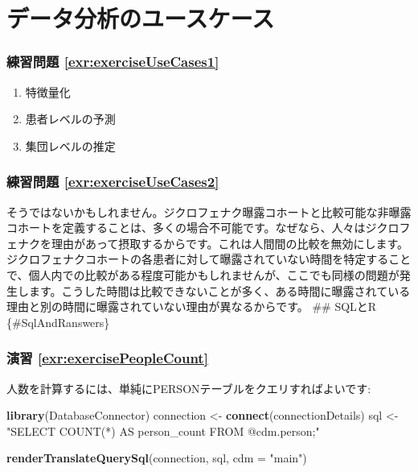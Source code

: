 \documentclass[
  11pt]{book}
\newenvironment{Shaded}{\begin{snugshade}}{\end{snugshade}}
\newcommand{\AttributeTok}[1]{\textcolor[rgb]{0.13,0.29,0.53}{#1}}
\newcommand{\FunctionTok}[1]{\textcolor[rgb]{0.13,0.29,0.53}{\textbf{#1}}}
\newcommand{\NormalTok}[1]{#1}
\newcommand{\OtherTok}[1]{\textcolor[rgb]{0.56,0.35,0.01}{#1}}
\newcommand{\StringTok}[1]{\textcolor[rgb]{0.31,0.60,0.02}{#1}}
\theoremstyle{definition}
\theoremstyle{definition}
\theoremstyle{definition}
\theoremstyle{definition}
\theoremstyle{remark}
\begin{document}
\section{データ分析のユースケース}\label{UseCasesanswers}

\subsubsection*{練習問題 \ref{exr:exerciseUseCases1}}\label{ux7df4ux7fd2ux554fux984c-refexrexerciseusecases1}

\begin{enumerate}
\def\labelenumi{\arabic{enumi}.}
\item
  特徴量化
\item
  患者レベルの予測
\item
  集団レベルの推定
\end{enumerate}

\subsubsection*{練習問題 \ref{exr:exerciseUseCases2}}\label{ux7df4ux7fd2ux554fux984c-refexrexerciseusecases2}

そうではないかもしれません。ジクロフェナク曝露コホートと比較可能な非曝露コホートを定義することは、多くの場合不可能です。なぜなら、人々はジクロフェナクを理由があって摂取するからです。これは人間間の比較を無効にします。ジクロフェナクコホートの各患者に対して曝露されていない時間を特定することで、個人内での比較がある程度可能かもしれませんが、ここでも同様の問題が発生します。こうした時間は比較できないことが多く、ある時間に曝露されている理由と別の時間に曝露されていない理由が異なるからです。
\#\# SQLとR \{\#SqlAndRanswers\}

\subsubsection*{演習 \ref{exr:exercisePeopleCount}}\label{ux6f14ux7fd2-refexrexercisepeoplecount}

人数を計算するには、単純にPERSONテーブルをクエリすればよいです:

\begin{Shaded}
\begin{Highlighting}[]
\FunctionTok{library}\NormalTok{(DatabaseConnector)}
\NormalTok{connection }\OtherTok{\textless{}{-}} \FunctionTok{connect}\NormalTok{(connectionDetails)}
\NormalTok{sql }\OtherTok{\textless{}{-}} \StringTok{"SELECT COUNT(*) AS person\_count}
\StringTok{FROM @cdm.person;"}

\FunctionTok{renderTranslateQuerySql}\NormalTok{(connection, sql, }\AttributeTok{cdm =} \StringTok{"main"}\NormalTok{)}
\end{Highlighting}
\end{Shaded}
\end{document}
